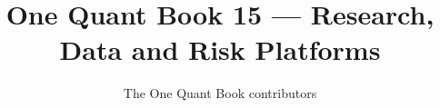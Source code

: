 \documentclass[11pt,a4paper,twoside,openany]{book}
\title{One Quant Book 15 --- Research, Data and Risk Platforms}
\author{The One Quant Book contributors}
\date{\bookdate}
\begin{document}
\frontmatter



\tableofcontents

\mainmatter


\appendix
\part{\omsolutionspart}


\backmatter
\printindex
\end{document}
